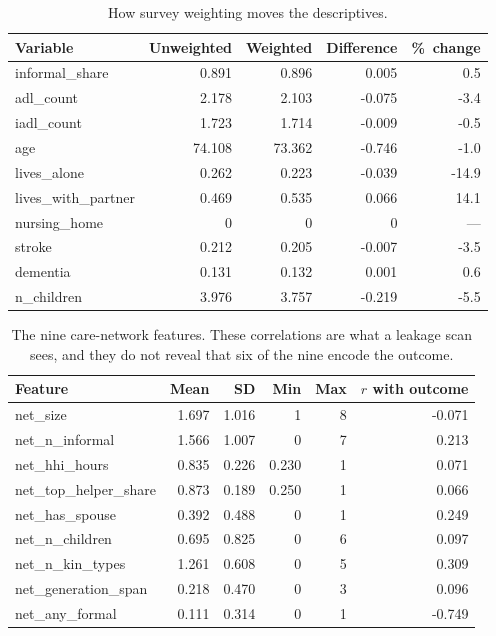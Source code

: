 \documentclass[9pt,twoside]{pnas-new}
\begin{document}
\begin{table}[!ht]
\centering
\caption{How survey weighting moves the descriptives.}
\label{tab:b-wtdesc}
\small
\begin{tabular}{lrrrr}
\toprule
Variable & Unweighted & Weighted & Difference & \%\ change \\
\midrule
informal\_share & 0.891 & 0.896 & 0.005 & 0.5 \\
adl\_count & 2.178 & 2.103 & -0.075 & -3.4 \\
iadl\_count & 1.723 & 1.714 & -0.009 & -0.5 \\
age & 74.108 & 73.362 & -0.746 & -1.0 \\
lives\_alone & 0.262 & 0.223 & -0.039 & -14.9 \\
lives\_with\_partner & 0.469 & 0.535 & 0.066 & 14.1 \\
nursing\_home & 0 & 0 & 0 & --- \\
stroke & 0.212 & 0.205 & -0.007 & -3.5 \\
dementia & 0.131 & 0.132 & 0.001 & 0.6 \\
n\_children & 3.976 & 3.757 & -0.219 & -5.5 \\
\bottomrule
\end{tabular}
\end{table}

\begin{table}[!ht]
\centering
\caption{The nine care-network features. These correlations are what a leakage scan sees, and they do not reveal that six of the nine encode the outcome.}
\label{tab:b-netfeat}
\footnotesize
\begin{tabular}{lrrrrr}
\toprule
Feature & Mean & SD & Min & Max & $r$ with outcome \\
\midrule
net\_size & 1.697 & 1.016 & 1 & 8 & -0.071 \\
net\_n\_informal & 1.566 & 1.007 & 0 & 7 & 0.213 \\
net\_hhi\_hours & 0.835 & 0.226 & 0.230 & 1 & 0.071 \\
net\_top\_helper\_share & 0.873 & 0.189 & 0.250 & 1 & 0.066 \\
net\_has\_spouse & 0.392 & 0.488 & 0 & 1 & 0.249 \\
net\_n\_children & 0.695 & 0.825 & 0 & 6 & 0.097 \\
net\_n\_kin\_types & 1.261 & 0.608 & 0 & 5 & 0.309 \\
net\_generation\_span & 0.218 & 0.470 & 0 & 3 & 0.096 \\
net\_any\_formal & 0.111 & 0.314 & 0 & 1 & -0.749 \\
\bottomrule
\end{tabular}
\end{table}
\end{document}
